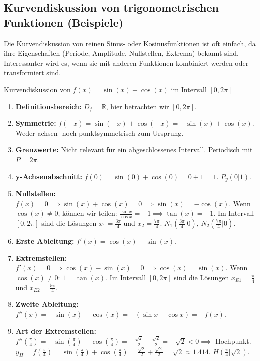 \subsection{Kurvendiskussion von trigonometrischen Funktionen (Beispiele)}
\label{subsec:kurvendiskussion_trig}

Die Kurvendiskussion von reinen Sinus- oder Kosinusfunktionen ist oft einfach, da ihre Eigenschaften (Periode, Amplitude, Nullstellen, Extrema) bekannt sind. Interessanter wird es, wenn sie mit anderen Funktionen kombiniert werden oder transformiert sind.

\begin{beispielumgebung}{Kurvendiskussion von $f(x) = \sin(x) + \cos(x)$ im Intervall $[0, 2\pi]$}
\begin{enumerate}
    \item \textbf{Definitionsbereich:} $D_f = \mathbb{R}$, hier betrachten wir $[0, 2\pi]$.
    \item \textbf{Symmetrie:} $f(-x) = \sin(-x)+\cos(-x) = -\sin(x)+\cos(x)$. Weder achsen- noch punktsymmetrisch zum Ursprung.
    \item \textbf{Grenzwerte:} Nicht relevant für ein abgeschlossenes Intervall. Periodisch mit $P=2\pi$.
    \item \textbf{y-Achsenabschnitt:} $f(0) = \sin(0)+\cos(0) = 0+1=1$. $P_y(0|1)$.
    \item \textbf{Nullstellen:} $f(x)=0 \implies \sin(x)+\cos(x)=0 \implies \sin(x)=-\cos(x)$.
        Wenn $\cos(x) \neq 0$, können wir teilen: $\frac{\sin x}{\cos x} = -1 \implies \tan(x)=-1$.
        Im Intervall $[0, 2\pi]$ sind die Lösungen $x_1 = \frac{3\pi}{4}$ und $x_2 = \frac{7\pi}{4}$.
        $N_1(\frac{3\pi}{4}|0)$, $N_2(\frac{7\pi}{4}|0)$.
    \item \textbf{Erste Ableitung:} $f'(x) = \cos(x) - \sin(x)$.
    \item \textbf{Extremstellen:} $f'(x)=0 \implies \cos(x) - \sin(x)=0 \implies \cos(x)=\sin(x)$.
        Wenn $\cos(x) \neq 0$: $1 = \tan(x)$.
        Im Intervall $[0, 2\pi]$ sind die Lösungen $x_{E1} = \frac{\pi}{4}$ und $x_{E2} = \frac{5\pi}{4}$.
    \item \textbf{Zweite Ableitung:} $f''(x) = -\sin(x) - \cos(x) = -(\sin x + \cos x) = -f(x)$.
    \item \textbf{Art der Extremstellen:}
        $f''(\frac{\pi}{4}) = -\sin(\frac{\pi}{4}) - \cos(\frac{\pi}{4}) = -\frac{\sqrt{2}}{2} - \frac{\sqrt{2}}{2} = -\sqrt{2} < 0 \implies$ Hochpunkt.
        $y_H = f(\frac{\pi}{4}) = \sin(\frac{\pi}{4})+\cos(\frac{\pi}{4}) = \frac{\sqrt{2}}{2} + \frac{\sqrt{2}}{2} = \sqrt{2} \approx 1.414$. $H(\frac{\pi}{4}|\sqrt{2})$.

\end{enumerate}
\end{beispielumgebung}

